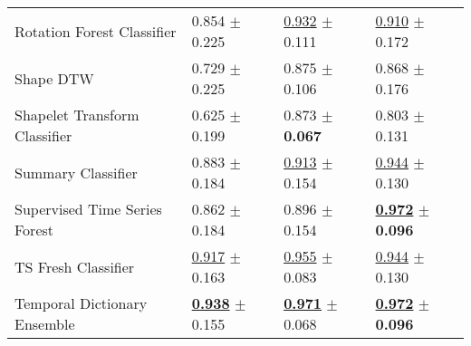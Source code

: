 \begin{tabular}{llll}
Rotation Forest Classifier & \textcolor[rgb]{0.1841004184,0.5000000000,0}{0.854} $\pm$ \textcolor[rgb]{0.8661764807,0.1338235193,0}{0.225} & \underline{\textcolor[rgb]{0.2369668246,0.5000000000,0}{0.932}} $\pm$ \textcolor[rgb]{0.5075844655,0.4924155345,0}{0.111} & \underline{\textcolor[rgb]{0.2500000000,0.5000000000,0}{0.910}} $\pm$ \textcolor[rgb]{0.7066015512,0.2933984488,0}{0.172} \\
Shape DTW & \textcolor[rgb]{0.4602510460,0.5000000000,0}{0.729} $\pm$ \textcolor[rgb]{0.8661764807,0.1338235193,0}{0.225} & \textcolor[rgb]{0.5781990521,0.4218009479,0}{0.875} $\pm$ \textcolor[rgb]{0.4502989485,0.5000000000,0}{0.106} & \textcolor[rgb]{0.4166666667,0.5000000000,0}{0.868} $\pm$ \textcolor[rgb]{0.7404054892,0.2595945108,0}{0.176} \\
Shapelet Transform Classifier & \textcolor[rgb]{0.6903765690,0.3096234310,0}{0.625} $\pm$ \textcolor[rgb]{0.7390823473,0.2609176527,0}{0.199} & \textcolor[rgb]{0.5894011202,0.4105988798,0}{0.873} $\pm$ \textbf{\textcolor[rgb]{0.0000000000,0.5000000000,0}{0.067}} & \textcolor[rgb]{0.6767676768,0.3232323232,0}{0.803} $\pm$ \textcolor[rgb]{0.3197266102,0.5000000000,0}{0.131} \\
Summary Classifier & \textcolor[rgb]{0.1196652720,0.5000000000,0}{0.883} $\pm$ \textcolor[rgb]{0.6617144942,0.3382855058,0}{0.184} & \underline{\textcolor[rgb]{0.3483412322,0.5000000000,0}{0.913}} $\pm$ \textcolor[rgb]{0.9935655119,0.0064344881,0}{0.154} & \underline{\textcolor[rgb]{0.1111111111,0.5000000000,0}{0.944}} $\pm$ \textcolor[rgb]{0.3121982484,0.5000000000,0}{0.130} \\
Supervised Time Series Forest & \textcolor[rgb]{0.1656903766,0.5000000000,0}{0.862} $\pm$ \textcolor[rgb]{0.6604374232,0.3395625768,0}{0.184} & \textcolor[rgb]{0.4478672986,0.5000000000,0}{0.896} $\pm$ \textcolor[rgb]{1.0000000000,0.0000000000,0}{0.154} & \underline{\textbf{\textcolor[rgb]{0.0000000000,0.5000000000,0}{0.972}}} $\pm$ \textbf{\textcolor[rgb]{0.0000000000,0.5000000000,0}{0.096}} \\
TS Fresh Classifier & \underline{\textcolor[rgb]{0.0460251046,0.5000000000,0}{0.917}} $\pm$ \textcolor[rgb]{0.5577723962,0.4422276038,0}{0.163} & \underline{\textcolor[rgb]{0.0995260664,0.5000000000,0}{0.955}} $\pm$ \textcolor[rgb]{0.1853514393,0.5000000000,0}{0.083} & \underline{\textcolor[rgb]{0.1111111111,0.5000000000,0}{0.944}} $\pm$ \textcolor[rgb]{0.3121982484,0.5000000000,0}{0.130} \\
Temporal Dictionary Ensemble & \underline{\textbf{\textcolor[rgb]{0.0000000000,0.5000000000,0}{0.938}}} $\pm$ \textcolor[rgb]{0.5209154293,0.4790845707,0}{0.155} & \underline{\textbf{\textcolor[rgb]{0.0000000000,0.5000000000,0}{0.971}}} $\pm$ \textcolor[rgb]{0.0113491881,0.5000000000,0}{0.068} & \underline{\textbf{\textcolor[rgb]{0.0000000000,0.5000000000,0}{0.972}}} $\pm$ \textbf{\textcolor[rgb]{0.0000000000,0.5000000000,0}{0.096}} \\

\end{tabular}
